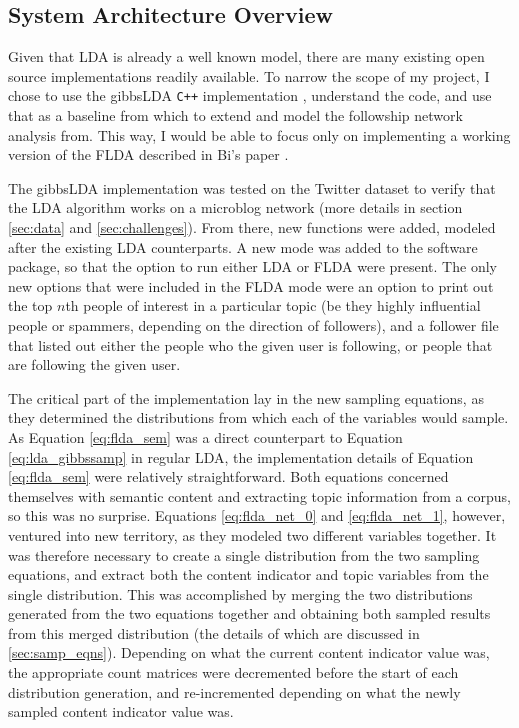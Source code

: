 \documentclass[a4paper]{article}
\begin{document}
\subsection{System Architecture Overview}
Given that LDA is already a well known model, there are many existing open source implementations readily available. To narrow the scope of my project, I chose to use the gibbsLDA \verb!C++! implementation \cite{gibbs_lda}, understand the code, and use that as a baseline from which to extend and model the followship network analysis from. This way, I would be able to focus only on implementing a working version of the FLDA described in Bi's paper \cite{flda}.

The gibbsLDA implementation was tested on the Twitter dataset to verify that the LDA algorithm works on a microblog network (more details in section \ref{sec:data} and \ref{sec:challenges}). From there, new functions were added, modeled after the existing LDA counterparts. A new mode was added to the software package, so that the option to run either LDA or FLDA were present. The only new options that were included in the FLDA mode were an option to print out the top $n$th people of interest in a particular topic (be they highly influential people or spammers, depending on the direction of followers), and a follower file that listed out either the people who the given user is following, or people that are following the given user.

The critical part of the implementation lay in the new sampling equations, as they determined the distributions from which each of the variables would sample. As Equation \ref{eq:flda_sem} was a direct counterpart to Equation \ref{eq:lda_gibbssamp} in regular LDA, the implementation details of Equation \ref{eq:flda_sem} were relatively straightforward. Both equations concerned themselves with semantic content and extracting topic information from a corpus, so this was no surprise. Equations \ref{eq:flda_net_0} and \ref{eq:flda_net_1}, however, ventured into new territory, as they modeled two different variables together. It was therefore necessary to create a single distribution from the two sampling equations, and extract both the content indicator and topic variables from the single distribution. This was accomplished by merging the two distributions generated from the two equations together and obtaining both sampled results from this merged distribution (the details of which are discussed in \ref{sec:samp_eqns}). Depending on what the current content indicator value was, the appropriate count matrices were decremented before the start of each distribution generation, and re-incremented depending on what the newly sampled content indicator value was.
\end{document}
